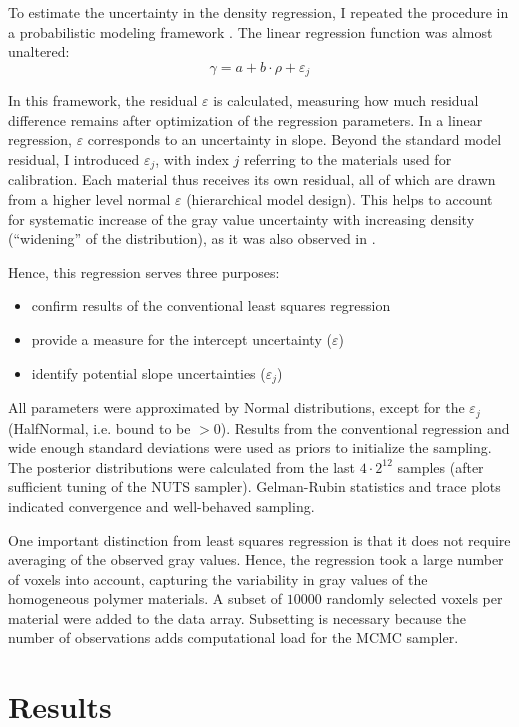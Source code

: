 To estimate the uncertainty in the density regression, I repeated the procedure in a probabilistic modeling framework \citep[PyMC, Version 5.6,][]{Salvatier2016}.
The linear regression function was almost unaltered:
\[\gamma = a+b\cdot\rho + \varepsilon_{j}\]


In this framework, the residual \(\varepsilon\) is calculated, measuring how much residual difference remains after optimization of the regression parameters.
In a linear regression, \(\varepsilon\) corresponds to an uncertainty in slope.
Beyond the standard model residual, I introduced \(\varepsilon_{j}\), with index \(j\) referring to the materials used for calibration.
Each material thus receives its own residual, all of which are drawn from a higher level normal \(\varepsilon\) (hierarchical model design).
This helps to account for systematic increase of the gray value uncertainty with increasing density (``widening'' of the distribution), as it was also observed in \citet{DuPlessis2013}.

Hence, this regression serves three purposes:
\begin{itemize}
\item confirm results of the conventional least squares regression
\item provide a measure for the intercept uncertainty (\(\varepsilon\))
\item identify potential slope uncertainties (\(\varepsilon_{j}\))
\end{itemize}


All parameters were approximated by Normal distributions, except for the \(\varepsilon_{j}\) (HalfNormal, i.e. bound to be \(>0\)).
Results from the conventional regression and wide enough standard deviations were used as priors to initialize the sampling.
The posterior distributions were calculated from the last \(4\cdot 2^{12}\) samples (after sufficient tuning of the NUTS sampler).
Gelman-Rubin statistics and trace plots indicated convergence and well-behaved sampling.


One important distinction from least squares regression is that it does not require averaging of the observed gray values.
Hence, the regression took a large number of voxels into account, capturing the variability in gray values of the homogeneous polymer materials.
A subset of \(10000\) randomly selected voxels per material were added to the data array.
Subsetting is necessary because the number of observations adds computational load for the MCMC sampler.


\section{Results}
\label{sec:orgd338191}
